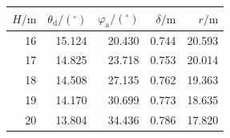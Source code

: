 \begin{tabular}{rrrrr}
\toprule
$H/\mathrm m$ & $\theta_{\mathrm d}/(^\circ)$ & $\varphi_{\mathrm a}/(^\circ)$ & $\delta/\mathrm m$ & $r/\mathrm m$ \\
\midrule
16 & 15.124 & 20.430 & 0.744 & 20.593 \\
17 & 14.825 & 23.718 & 0.753 & 20.014 \\
18 & 14.508 & 27.135 & 0.762 & 19.363 \\
19 & 14.170 & 30.699 & 0.773 & 18.635 \\
20 & 13.804 & 34.436 & 0.786 & 17.820 \\
\bottomrule
\end{tabular}
